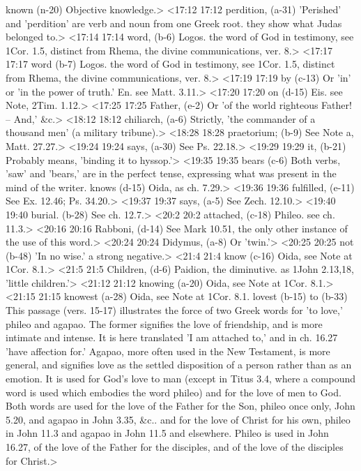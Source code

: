   known (n-20)  Objective knowledge.>
<17:12 17:12  perdition, (a-31)  'Perished' and 'perdition' are verb and noun from one Greek  root. they show what Judas belonged to.>
<17:14 17:14  word, (b-6)  Logos. the word of God in testimony, see 1Cor. 1.5,  distinct from Rhema, the divine communications, ver. 8.>
<17:17 17:17  word (b-7)  Logos. the word of God in testimony, see 1Cor. 1.5,  distinct from Rhema, the divine communications, ver. 8.>
<17:19 17:19  by (c-13)  Or 'in' or 'in the power of truth.' En. see Matt. 3.11.>
<17:20 17:20  on (d-15)  Eis. see Note, 2Tim. 1.12.>
<17:25 17:25  Father, (e-2)  Or 'of the world righteous Father! -- And,' &c.>
<18:12 18:12  chiliarch, (a-6)  Strictly, 'the commander of a thousand men' (a military  tribune).>
<18:28 18:28  praetorium; (b-9)  See Note a, Matt. 27.27.>
<19:24 19:24  says, (a-30)  See Ps. 22.18.>
<19:29 19:29  it, (b-21)  Probably means, 'binding it to hyssop.'>
<19:35 19:35  bears (c-6)  Both verbs, 'saw' and 'bears,' are in the perfect tense,  expressing what was present in the mind of the writer.
  knows (d-15)  Oida, as ch. 7.29.>
<19:36 19:36  fulfilled, (e-11)  See Ex. 12.46; Ps. 34.20.>
<19:37 19:37  says, (a-5)  See Zech. 12.10.>
<19:40 19:40  burial. (b-28)  See ch. 12.7.>
<20:2 20:2  attached, (c-18)  Phileo. see ch. 11.3.>
<20:16 20:16  Rabboni, (d-14)  See Mark 10.51, the only other instance of the use of this  word.>
<20:24 20:24  Didymus, (a-8)  Or 'twin.'>
<20:25 20:25  not (b-48)  'In no wise.' a strong negative.>
<21:4 21:4  know (c-16)  Oida, see Note at 1Cor. 8.1.>
<21:5 21:5  Children, (d-6)  Paidion, the diminutive. as 1John 2.13,18, 'little  children.'>
<21:12 21:12  knowing (a-20)  Oida, see Note at 1Cor. 8.1.>
<21:15 21:15  knowest (a-28)  Oida, see Note at 1Cor. 8.1.
  lovest (b-15)  to (b-33)
  This passage (vers. 15-17) illustrates the force of two Greek  words for 'to love,' phileo and agapao. The former  signifies the love of friendship, and is more intimate and  intense. It is here translated 'I am attached to,' and in ch.  16.27 'have affection for.' Agapao, more often used in the  New Testament, is more general, and signifies love as the  settled disposition of a person rather than as an emotion. It  is used for God's love to man (except in Titus 3.4, where a  compound word is used which embodies the word phileo) and for  the love of men to God. Both words are used for the love of the  Father for the Son, phileo once only, John 5.20, and agapao  in John 3.35, &c.. and for the love of Christ for his own,  phileo in John 11.3 and agapao in John 11.5 and elsewhere.  Phileo is used in John 16.27, of the love of the Father for  the disciples, and of the love of the disciples for Christ.>
